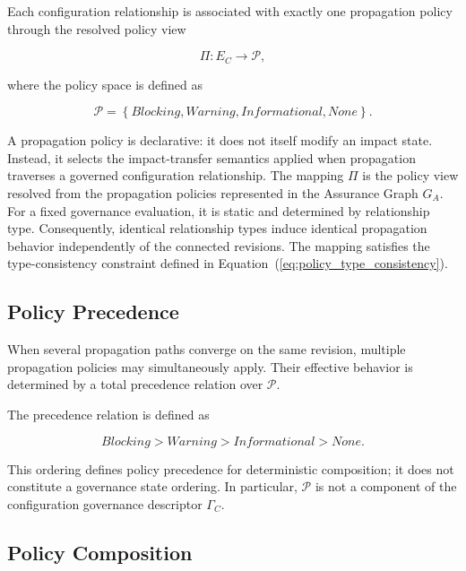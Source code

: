 \documentclass[10pt]{article}
\begin{document}
Each configuration relationship is associated with exactly one propagation policy through the resolved policy view

\begin{equation}
	\Pi:E_C\rightarrow\mathcal P,
	\label{eq:policy_mapping_formal}
\end{equation}

where the policy space is defined as

\begin{equation}
	\mathcal{P}=
	\left\{
	\textit{Blocking},
	\textit{Warning},
	\textit{Informational},
	\textit{None}
	\right\}.
	\label{eq:policy_set}
\end{equation}

A propagation policy is declarative: it does not itself modify an impact state. Instead, it selects the impact-transfer semantics applied when propagation traverses a governed configuration relationship.
The mapping $\Pi$ is the policy view resolved from the propagation policies represented in the Assurance Graph $G_A$. For a fixed governance evaluation, it is static and determined by relationship type. Consequently, identical relationship types induce identical propagation behavior independently of the connected revisions. The mapping satisfies the type-consistency constraint defined in Equation~(\ref{eq:policy_type_consistency}).

\subsection{Policy Precedence}

When several propagation paths converge on the same revision, multiple propagation policies may simultaneously apply. Their effective behavior is determined by a total precedence relation over $\mathcal{P}$.

The precedence relation is defined as

\begin{equation}
	\textit{Blocking}
	>
	\textit{Warning}
	>
	\textit{Informational}
	>
	\textit{None}.
	\label{eq:policy_order}
\end{equation}

This ordering defines policy precedence for deterministic composition; it does not constitute a governance state ordering. In particular, $\mathcal P$ is not a component of the configuration governance descriptor $\Gamma_C$.

\subsection{Policy Composition}
\end{document}
